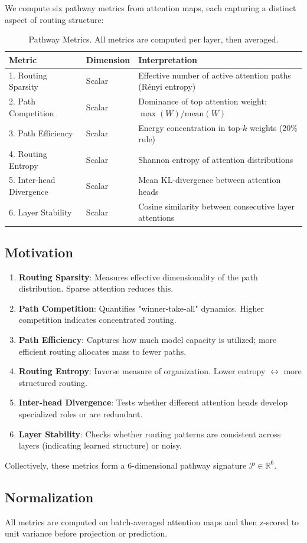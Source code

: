 We compute six pathway metrics from attention maps, each capturing a distinct aspect of routing structure:

\begin{table}[H]
\centering
\small
\begin{tabular}{llp{5cm}}
\toprule
\textbf{Metric} & \textbf{Dimension} & \textbf{Interpretation} \\
\midrule
1. Routing Sparsity & Scalar & Effective number of active attention paths (Rényi entropy) \\
2. Path Competition & Scalar & Dominance of top attention weight: $\max(W) / \text{mean}(W)$ \\
3. Path Efficiency & Scalar & Energy concentration in top-$k$ weights (20\% rule) \\
4. Routing Entropy & Scalar & Shannon entropy of attention distributions \\
5. Inter-head Divergence & Scalar & Mean KL-divergence between attention heads \\
6. Layer Stability & Scalar & Cosine similarity between consecutive layer attentions \\
\bottomrule
\end{tabular}
\caption{Pathway Metrics. All metrics are computed per layer, then averaged.}
\label{tab:metrics}
\end{table}

\subsection*{Motivation}

\begin{enumerate}
    \item \textbf{Routing Sparsity}: Measures effective dimensionality of the path distribution. Sparse attention reduces this.
    \item \textbf{Path Competition}: Quantifies "winner-take-all" dynamics. Higher competition indicates concentrated routing.
    \item \textbf{Path Efficiency}: Captures how much model capacity is utilized; more efficient routing allocates mass to fewer paths.
    \item \textbf{Routing Entropy}: Inverse measure of organization. Lower entropy $\leftrightarrow$ more structured routing.
    \item \textbf{Inter-head Divergence}: Tests whether different attention heads develop specialized roles or are redundant.
    \item \textbf{Layer Stability}: Checks whether routing patterns are consistent across layers (indicating learned structure) or noisy.
\end{enumerate}

Collectively, these metrics form a 6-dimensional pathway signature $\mathcal{P} \in \mathbb{R}^6$.

\subsection*{Normalization}

All metrics are computed on batch-averaged attention maps and then z-scored to unit variance before projection or prediction.
